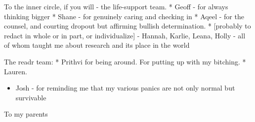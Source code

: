 To the inner circle, if you will - the life-support team. * Geoff - for
always thinking bigger * Shane - for genuinely caring and checking in *
Aqeel - for the counsel, and courting dropout but affirming bullish
determination. * {[}probably to redact in whole or in part, or
individualize{]} - Hannah, Karlie, Leana, Holly - all of whom taught me
about research and its place in the world

The readr team: * Prithvi for being around. For putting up with my
bitching. * Lauren.

\begin{itemize}
\tightlist
\item
  Josh - for reminding me that my various panics are not only normal but
  survivable
\end{itemize}

To my parents
